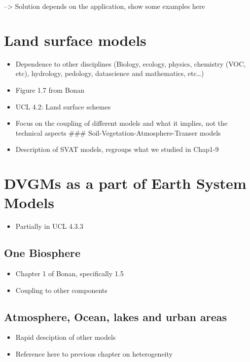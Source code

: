 \documentclass[12pt,oneside]{book}
\providecommand{\tightlist}{%
  \setlength{\itemsep}{0pt}\setlength{\parskip}{0pt}}
\begin{document}
--\textgreater{} Solution depends on the application, show some examples
here

\section{Land surface models}\label{land-surface-models}

\begin{itemize}
\tightlist
\item
  Dependence to other disciplines (Biology, ecology, physics, chemistry
  (VOC, etc), hydrology, pedology, datascience and mathematics,
  etc\ldots{})
\item
  Figure 1.7 from Bonan
\item
  UCL 4.2: Land surface schemes
\item
  Focus on the coupling of different models and what it implies, not the
  technical aspects \#\#\# Soil-Vegetation-Atmosphere-Transer models
\item
  Description of SVAT models, regroups what we studied in Chap1-9
\end{itemize}

\section{DVGMs as a part of Earth System
Models}\label{dvgms-as-a-part-of-earth-system-models}

\begin{itemize}
\tightlist
\item
  Partially in UCL 4.3.3
\end{itemize}

\subsection{One Biosphere}\label{one-biosphere}

\begin{itemize}
\tightlist
\item
  Chapter 1 of Bonan, specifically 1.5
\item
  Coupling to other components
\end{itemize}

\subsection{Atmosphere, Ocean, lakes and urban
areas}\label{atmosphere-ocean-lakes-and-urban-areas}

\begin{itemize}
\tightlist
\item
  Rapid desciption of other models
\item
  Reference here to previous chapter on heterogeneity
\end{itemize}
\end{document}
